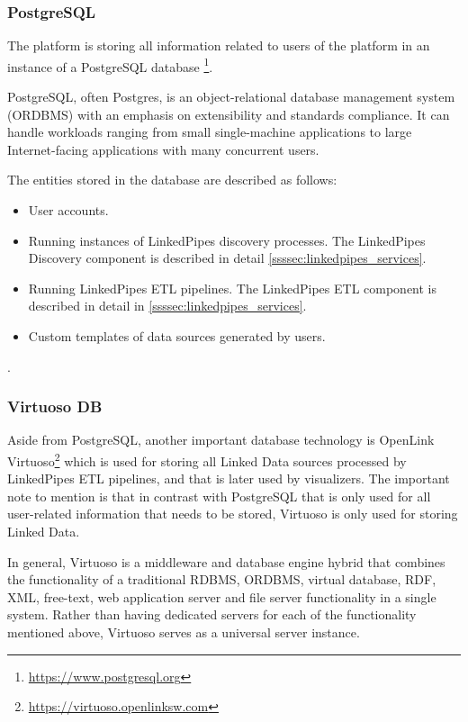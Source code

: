 \subsubsection{PostgreSQL} 

The \lpa{} platform is storing all information related to users of the platform in an instance of a PostgreSQL database \footnote{\url{https://www.postgresql.org}}. 

PostgreSQL, often Postgres, is an object-relational database management system (ORDBMS) with an emphasis on extensibility and standards compliance. It can handle workloads ranging from small single-machine applications to large Internet-facing applications with many concurrent users.

The entities stored in the database are described as follows:
\begin{itemize}
\item User accounts.
\item Running instances of LinkedPipes discovery processes. The LinkedPipes Discovery component is described in detail \autoref{ssssec:linkedpipes_services}.
\item Running LinkedPipes ETL pipelines. The LinkedPipes ETL component is described in detail in \autoref{ssssec:linkedpipes_services}.
\item Custom templates of data sources generated by users.
\end{itemize}.

\subsubsection{Virtuoso DB}

Aside from PostgreSQL, another important database technology is OpenLink Virtuoso\footnote{\url{https://virtuoso.openlinksw.com}} which is used for storing all Linked Data sources processed by LinkedPipes ETL pipelines, and that is later used by \lpa{} visualizers. The important note to mention is that in contrast with PostgreSQL that is only used for all user-related information that needs to be stored, Virtuoso is only used for storing Linked Data. 

In general, Virtuoso is a middleware and database engine hybrid that combines the functionality of a traditional \gls{RDBMS}, \gls{ORDBMS}, virtual database, RDF, XML, free-text, web application server and file server functionality in a single system. Rather than having dedicated servers for each of the functionality mentioned above, Virtuoso serves as a universal server instance.

